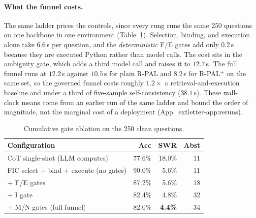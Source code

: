 \documentclass[sigconf]{acmart}
\newcommand{\vqSWRMed}{2.8\%}
\newcommand{\vqSWRHard}{4.3\%}
\newcommand{\vqSWRatioMed}{5.0$\times$}
\newcommand{\vqSWRatioHard}{6.7$\times$}
\newcommand{\cotSWRMed}{13.9\%}
\newcommand{\cotSWRHard}{28.6\%}
\newif\ifarxiv
\newcommand{\extref}[1]{App.~\ifarxiv\ref{#1}\else\csname extletter-#1\endcsname\fi}
\begin{document}
\paragraph{What the funnel costs.}
The same ladder prices the controls, since every rung runs the same 250 questions on one backbone in one environment (Table~\ref{tab:v2gateladder}).
Selection, binding, and execution alone take $6.6$\,s per question, and the \emph{deterministic} F/E gates add only $0.2$\,s because they are executed Python rather than model calls. The cost sits in the ambiguity gate, which adds a third model call and raises it to $12.7$\,s. The full funnel runs at $12.2$\,s against $10.5$\,s for plain R-PAL and $8.2$\,s for R-PAL$^{+}$ on the same set, so the governed funnel costs roughly $1.2\times$ a retrieval-and-execution baseline and under a third of five-sample self-consistency ($38.1$\,s).
These wall-clock means come from an earlier run of the same ladder and bound the order of magnitude, not the marginal cost of a deployment (\extref{app:reruns}).

\begin{table}[t]
\caption{Cumulative gate ablation on the 250 clean questions.}
\label{tab:v2gateladder}
\small
\begin{tabular}{@{}lrrr@{}}
\toprule
Configuration & Acc & SWR & Abst \\
\midrule
CoT single-shot (LLM computes) & 77.6\% & 18.0\% & 11 \\
FIC select + bind + execute (no gates) & 90.0\% & 5.6\% & 11 \\
\quad + F/E gates & 87.2\% & 5.6\% & 18 \\
\quad + I gate & 82.4\% & 4.8\% & 32 \\
\quad + M/N gates (full funnel) & 82.0\% & \textbf{4.4\%} & 34 \\
\bottomrule
\end{tabular}
\end{table}

\end{document}
